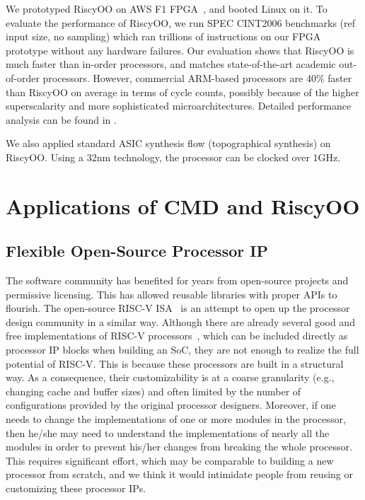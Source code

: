 \documentclass[conference]{IEEEtran}
\begin{document}
We prototyped RiscyOO on AWS F1 FPGA~\cite{awsf1}, and booted Linux on it.
To evaluate the performance of RiscyOO, we run SPEC CINT2006 benchmarks (ref input size, no sampling) which ran trillions of instructions on our FPGA prototype without any hardware failures.
Our evaluation shows that RiscyOO is much faster than in-order processors, and matches state-of-the-art academic out-of-order processors.
However, commercial ARM-based processors are 40\% faster than RiscyOO on average in terms of cycle counts, possibly because of the higher superscalarity and more sophisticated microarchitectures.
Detailed performance analysis can be found in \cite{riscyoo}.

We also applied standard ASIC synthesis flow (topographical synthesis) on RiscyOO.
Using a 32nm technology, the processor can be clocked over 1GHz.


\section{Applications of CMD and RiscyOO}\label{sec:app}

\subsection{Flexible Open-Source Processor IP}
The software community has benefited for years from open-source projects and permissive licensing. 
This has allowed reusable libraries with proper APIs to flourish. 
The open-source RISC-V ISA~\cite{riscv} is an attempt to open up the processor design community in a similar way.
Although there are already several good and free implementations of RISC-V processors~\cite{rocketchip,boom,pulp}, which can be included directly as processor IP blocks when building an SoC, they are not enough to realize the full potential of RISC-V.
This is because these processors are built in a structural way.
As a consequence, their customizability is at a coarse granularity (e.g., changing cache and buffer sizes) and often limited by the number of configurations provided by the original processor designers.
Moreover, if one needs to change the implementations of one or more modules in the processor, then he/she may need to understand the implementations of nearly all the modules in order to prevent his/her changes from breaking the whole processor.
This requires significant effort, which may be comparable to building a new processor from scratch, and we think it would intimidate people from reusing or customizing these processor IPs.
\end{document}
